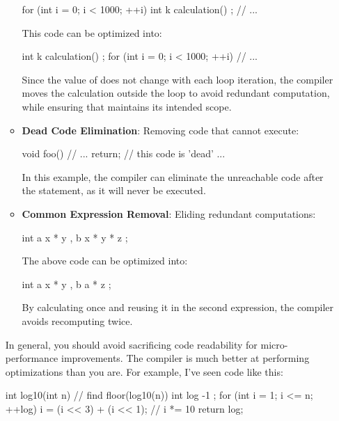 \documentclass[12pt]{article}
\begin{document}
\begin{enumerate}
\begin{itemize}
\begin{cxx}{}
for (int i = 0; i < 1000; ++i)
{
	int k { calculation() };
	// ...
}
\end{cxx}

\noindent
This code can be optimized into:

\begin{cxx}{}
int k { calculation() };
for (int i = 0; i < 1000; ++i)
{
	// ...
}
\end{cxx}

\noindent
Since the value of  does not change with each loop iteration, the compiler moves the calculation outside the loop to avoid redundant computation, while ensuring that  maintains its intended scope.

\item{\textbf{Dead Code Elimination}: Removing code that cannot execute:}

\begin{cxx}{}
void foo()
{
	// ...
	return;
	// this code is 'dead' ...
}
\end{cxx}

\noindent
In this example, the compiler can eliminate the unreachable code after the  statement, as it will never be executed.

\item{\textbf{Common Expression Removal}: Eliding redundant computations:}

\begin{cxx}{}
int a { x * y }, b { x * y * z };
\end{cxx}

\noindent
The above code can be optimized into:

\begin{cxx}{}
int a { x * y }, b { a * z };
\end{cxx}

\noindent
By calculating  once and reusing it in the second expression, the compiler avoids recomputing  twice.

\end{itemize}

\begin{advice}
\noindent
In general, you should avoid sacrificing code readability for micro-performance improvements.
The compiler is much better at performing optimizations than you are.
For example, I've seen code like this:
\end{advice}

\begin{cxx}{}
int log10(int n) { // find floor(log10(n))
	int log { -1 };
	for (int i = 1; i <= n; ++log) {
		i = (i << 3) + (i << 1); // i *= 10
	}
	return log;
}
\end{cxx}


\end{enumerate}
\end{document}
